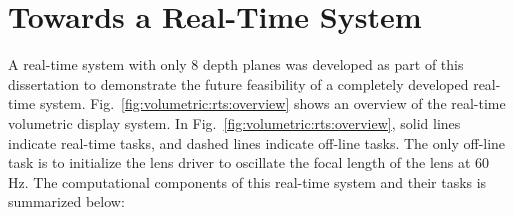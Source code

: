 \section{Towards a Real-Time System}
\label{sec:volumetric:rts}


A real-time system with only 8 depth planes was developed as part of this dissertation to demonstrate the future feasibility of a completely developed real-time system.
Fig.~\ref{fig:volumetric:rts:overview} shows an overview of the real-time volumetric display system.
In Fig.~\ref{fig:volumetric:rts:overview}, solid lines indicate real-time tasks, and dashed lines indicate off-line tasks.
The only off-line task is to initialize the lens driver to oscillate the focal length of the lens at 60 Hz. 
The computational components of this real-time system and their tasks is summarized below:

